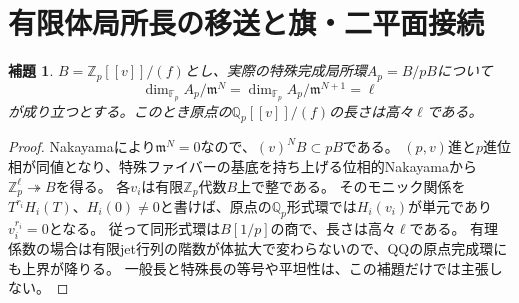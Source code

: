 \documentclass[11pt,a4paper]{ltjsarticle}
\newtheorem{lemma}[theorem]{補題}
\theoremstyle{remark}
\begin{document}
\section{有限体局所長の移送と旗・二平面接続}
\begin{lemma}
$B=\mathbb Z_p[[v]]/(f)$とし、実際の特殊完成局所環$A_p=B/pB$について
\[
 \dim_{\mathbb F_p}A_p/\mathfrak m^N
 =\dim_{\mathbb F_p}A_p/\mathfrak m^{N+1}=\ell
\]
が成り立つとする。このとき原点の$\mathbb Q_p[[v]]/(f)$の長さは高々$\ell$である。
\end{lemma}
\begin{proof}
Nakayamaにより$\mathfrak m^N=0$なので、$(v)^NB\subset pB$である。
$(p,v)$進と$p$進位相が同値となり、特殊ファイバーの基底を持ち上げる位相的Nakayamaから
$\mathbb Z_p^\ell\twoheadrightarrow B$を得る。
各$v_i$は有限$\mathbb Z_p$代数$B$上で整である。
そのモニック関係を$T^{r_i}H_i(T)$、$H_i(0)\ne0$と書けば、原点の$\mathbb Q_p$形式環では$H_i(v_i)$が単元であり$v_i^{r_i}=0$となる。
従って同形式環は$B[1/p]$の商で、長さは高々$\ell$である。
有理係数の場合は有限jet行列の階数が体拡大で変わらないので、QQの原点完成環にも上界が降りる。
一般長と特殊長の等号や平坦性は、この補題だけでは主張しない\cite{adic-length-v41}。
\end{proof}
\end{document}
